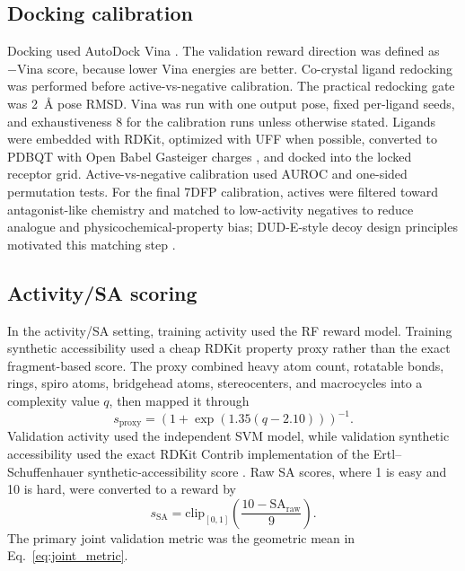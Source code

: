 \documentclass[referee,lineno,pdflatex,sn-basic]{sn-jnl}
\theoremstyle{thmstyleone}%
\theoremstyle{thmstyletwo}%
\theoremstyle{thmstylethree}%
\begin{document}
\subsection{Docking calibration}\label{subsec:docking_methods}

Docking used AutoDock Vina \cite{ref-vina}. The validation reward direction was defined as $-\mathrm{Vina}$ score, because lower Vina energies are better. Co-crystal ligand redocking was performed before active-vs-negative calibration. The practical redocking gate was 2~\AA{} pose RMSD. Vina was run with one output pose, fixed per-ligand seeds, and exhaustiveness 8 for the calibration runs unless otherwise stated. Ligands were embedded with RDKit, optimized with UFF when possible, converted to PDBQT with Open Babel Gasteiger charges \cite{ref-openbabel}, and docked into the locked receptor grid. Active-vs-negative calibration used AUROC and one-sided permutation tests. For the final 7DFP calibration, actives were filtered toward antagonist-like chemistry and matched to low-activity negatives to reduce analogue and physicochemical-property bias; DUD-E-style decoy design principles motivated this matching step \cite{ref-dude}.

\subsection{Activity/SA scoring}\label{subsec:sa_methods}

In the activity/SA setting, training activity used the RF reward model. Training synthetic accessibility used a cheap RDKit property proxy rather than the exact fragment-based score. The proxy combined heavy atom count, rotatable bonds, rings, spiro atoms, bridgehead atoms, stereocenters, and macrocycles into a complexity value $q$, then mapped it through
\begin{equation}
s_{\mathrm{proxy}} = \left(1+\exp(1.35(q-2.10))\right)^{-1}.
\label{eq:sa_proxy}
\end{equation}
Validation activity used the independent SVM model, while validation synthetic accessibility used the exact RDKit Contrib implementation of the Ertl--Schuffenhauer synthetic-accessibility score \cite{ref-sa}. Raw SA scores, where 1 is easy and 10 is hard, were converted to a reward by
\begin{equation}
s_{\mathrm{SA}} = \mathrm{clip}_{[0,1]}\left(\frac{10-\mathrm{SA}_{\mathrm{raw}}}{9}\right).
\label{eq:sa_exact}
\end{equation}
The primary joint validation metric was the geometric mean in Eq.~\ref{eq:joint_metric}.
\end{document}
